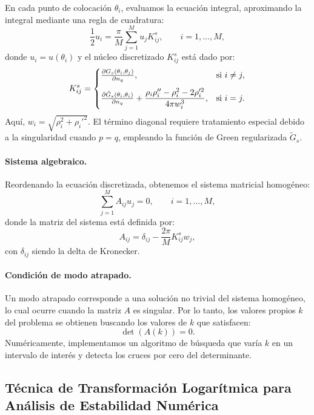 \documentclass[11pt]{article}
\begin{document}
En cada punto de colocación $\theta_i$, evaluamos la ecuación integral, aproximando la integral mediante una regla de cuadratura:
\begin{equation}
\frac{1}{2} u_i = \frac{\pi}{M} \sum_{j=1}^M u_j K^s_{ij}, \qquad i = 1, \dots, M,
\end{equation}
donde $u_i = u(\theta_i)$ y el núcleo discretizado $K^s_{ij}$ está dado por:
\begin{equation}
K^s_{ij} = 
\begin{cases}
\pdv{G_s(\theta_i, \theta_j)}{n_q}, & \text{si } i \neq j,\\[0.8em]
\pdv{\tilde{G}_s(\theta_i, \theta_i)}{n_q} + \dfrac{\rho_i \rho_i'' - \rho_i^2 - 2\rho_i'^2}{4\pi w_i^3}, & \text{si } i=j.
\end{cases}
\end{equation}
Aquí, $w_i = \sqrt{\rho_i^2 + \rho_i'^2}$. El término diagonal requiere tratamiento especial debido a la singularidad cuando $p = q$, empleando la función de Green regularizada $\tilde{G}_s$.

\paragraph{Sistema algebraico.} Reordenando la ecuación discretizada, obtenemos el sistema matricial homogéneo:
\begin{equation}
\sum_{j=1}^M A_{ij} u_j = 0, \qquad i = 1, \dots, M,
\end{equation}
donde la matriz del sistema está definida por:
\begin{equation}
A_{ij} = \delta_{ij} - \frac{2\pi}{M} K^s_{ij} w_j,
\end{equation}
con $\delta_{ij}$ siendo la delta de Kronecker.

\paragraph{Condición de modo atrapado.} Un modo atrapado corresponde a una solución no trivial del sistema homogéneo, lo cual ocurre cuando la matriz $A$ es singular. Por lo tanto, los valores propios $k$ del problema se obtienen buscando los valores de $k$ que satisfacen:
\begin{equation}
\det(A(k)) = 0.
\end{equation}
Numéricamente, implementamos un algoritmo de búsqueda que varía $k$ en un intervalo de interés y detecta los cruces por cero del determinante.

\subsection{Técnica de Transformación Logarítmica para Análisis de Estabilidad Numérica}
\end{document}
